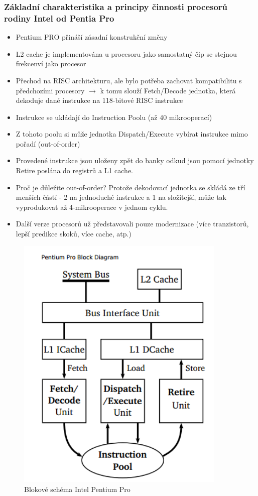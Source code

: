 \documentclass[10pt,a4paper]{article}
\begin{document}
\subsubsection{Základní charakteristika a principy činnosti procesorů rodiny Intel od Pentia Pro}
\begin{itemize}
\item Pentium PRO přináší zásadní konstrukční změny
\item L2 cache je implementována u procesoru jako samostatný čip se stejnou frekcenví jako procesor
\item Přechod na RISC architekturu, ale bylo potřeba zachovat kompatibilitu s předchozími procesory $\rightarrow$ k tomu slouží Fetch/Decode jednotka, která dekoduje dané instrukce na 118-bitové RISC instrukce
\item Instrukce se ukládají do Instruction Poolu (až 40 mikrooperací)
\item Z tohoto poolu si může jednotka Dispatch/Execute vybírat instrukce mimo pořadí (out-of-order)
\item Provedené instrukce jsou uloženy zpět do banky odkud jsou pomocí jednotky Retire poslána do registrů a L1 cache.
\item Proč je důležite out-of-order? Protože dekodovací jednotka se skládá ze tří menších částí - 2 na jednoduché instrukce a 1 na složitejší, může tak vyprodukovat až 4-mikrooperace v jednom cyklu.
\item Další verze procesorů už představovali pouze modernizace (více tranzistorů, lepší predikce skoků, více cache, atp.)
\end{itemize}
\begin{figure}[ht]
    \centering
    \includegraphics[width=10cm]{ppro.png}
    \caption{Blokové schéma Intel Pentium Pro}
    \label{fig:ppro}
\end{figure}
\newpage
\end{document}

